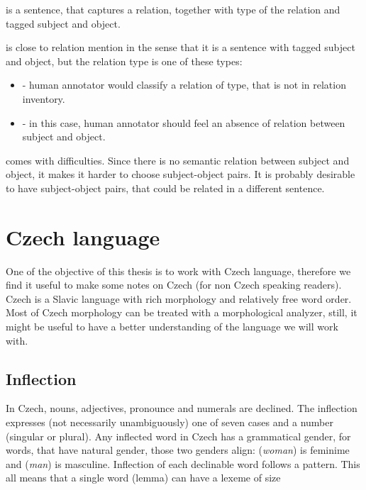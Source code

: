  is a sentence, that captures a relation, together with type of the relation and tagged subject and object. 

 is close to relation mention in the sense that it is a sentence with tagged subject and object, but the relation type is one of these types: 
\begin{itemize}
\item {} - human annotator would classify a relation of type, that is not in relation inventory. 
\item {} - in this case, human annotator should feel an absence of relation between subject and object.  

\end{itemize}

 comes with difficulties. Since there is no semantic relation between subject and object, it makes it harder to choose subject-object pairs. It is probably desirable to have subject-object pairs, that could be related in a different sentence. 

 

 


\section{Czech language}
One of the objective of this thesis is to work with Czech language, therefore we find it useful to make some notes on Czech (for non Czech speaking readers). Czech is a Slavic language with rich morphology and relatively free word order. Most of Czech morphology can be treated with a morphological analyzer, still, it might be useful to have a better understanding of the language we will work with.

\subsection{Inflection}
In Czech, nouns, adjectives, pronounce and numerals are declined. The inflection expresses (not necessarily unambiguously) one of seven cases and a number (singular or plural). Any inflected word in Czech has a grammatical gender, for words, that have natural gender, those two genders align:  (\textit{woman}) is feminime and  (\textit{man}) is masculine. Inflection of each declinable word follows a pattern. This all means that a single word (lemma) can have a lexeme of size 

